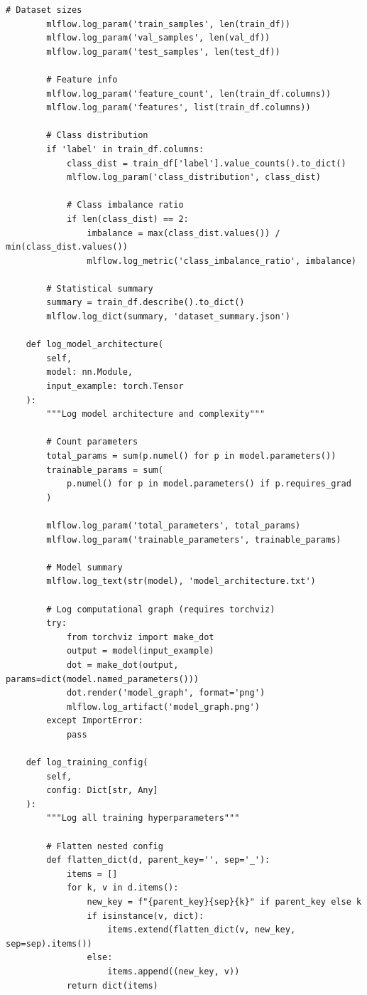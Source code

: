 \begin{lstlisting}[style=python, caption=Comprehensive Experiment Tracking with MLflow]
        # Dataset sizes
        mlflow.log_param('train_samples', len(train_df))
        mlflow.log_param('val_samples', len(val_df))
        mlflow.log_param('test_samples', len(test_df))

        # Feature info
        mlflow.log_param('feature_count', len(train_df.columns))
        mlflow.log_param('features', list(train_df.columns))

        # Class distribution
        if 'label' in train_df.columns:
            class_dist = train_df['label'].value_counts().to_dict()
            mlflow.log_param('class_distribution', class_dist)

            # Class imbalance ratio
            if len(class_dist) == 2:
                imbalance = max(class_dist.values()) / min(class_dist.values())
                mlflow.log_metric('class_imbalance_ratio', imbalance)

        # Statistical summary
        summary = train_df.describe().to_dict()
        mlflow.log_dict(summary, 'dataset_summary.json')

    def log_model_architecture(
        self,
        model: nn.Module,
        input_example: torch.Tensor
    ):
        """Log model architecture and complexity"""

        # Count parameters
        total_params = sum(p.numel() for p in model.parameters())
        trainable_params = sum(
            p.numel() for p in model.parameters() if p.requires_grad
        )

        mlflow.log_param('total_parameters', total_params)
        mlflow.log_param('trainable_parameters', trainable_params)

        # Model summary
        mlflow.log_text(str(model), 'model_architecture.txt')

        # Log computational graph (requires torchviz)
        try:
            from torchviz import make_dot
            output = model(input_example)
            dot = make_dot(output, params=dict(model.named_parameters()))
            dot.render('model_graph', format='png')
            mlflow.log_artifact('model_graph.png')
        except ImportError:
            pass

    def log_training_config(
        self,
        config: Dict[str, Any]
    ):
        """Log all training hyperparameters"""

        # Flatten nested config
        def flatten_dict(d, parent_key='', sep='_'):
            items = []
            for k, v in d.items():
                new_key = f"{parent_key}{sep}{k}" if parent_key else k
                if isinstance(v, dict):
                    items.extend(flatten_dict(v, new_key, sep=sep).items())
                else:
                    items.append((new_key, v))
            return dict(items)


\end{lstlisting}
